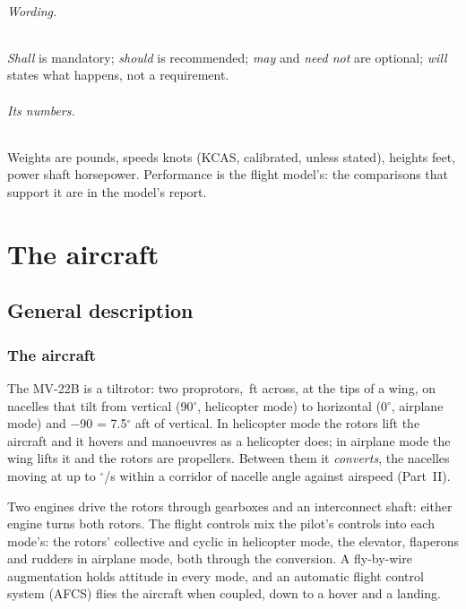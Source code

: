 \documentclass[11pt,a4paper,oneside]{book}
\begin{document}
\paragraph{Wording.} \emph{Shall} is mandatory; \emph{should} is recommended; \emph{may} and \emph{need not} are optional;
\emph{will} states what happens, not a requirement.

\paragraph{Its numbers.} Weights are pounds, speeds knots (KCAS, calibrated, unless stated), heights feet, power shaft
horsepower. Performance is the flight model's: the comparisons that support it are in the model's report.

\tableofcontents

\mainmatter
\part{The aircraft}
\chapter{General description}
\section{The aircraft}
The MV-22B is a tiltrotor: two proprotors, \MRotorDia{}\,ft across, at the tips of a wing, on nacelles that tilt from
vertical (90$^\circ$, helicopter mode) to horizontal (0$^\circ$, airplane mode) and \MNacMax{}$-$90 = 7.5$^\circ$ aft
of vertical. In helicopter mode the rotors lift the aircraft and it hovers and manoeuvres as a helicopter does; in
airplane mode the wing lifts it and the rotors are propellers. Between them it \emph{converts}, the nacelles moving
at up to \MNacRate$^\circ$/s within a corridor of nacelle angle against airspeed (Part~II).

Two engines drive the rotors through gearboxes and an interconnect shaft: either engine turns both rotors. The flight
controls mix the pilot's controls into each mode's: the rotors' collective and cyclic in helicopter mode, the
elevator, flaperons and rudders in airplane mode, both through the conversion. A fly-by-wire augmentation holds
attitude in every mode, and an automatic flight control system (AFCS) flies the aircraft when coupled, down to a
hover and a landing.
\end{document}
